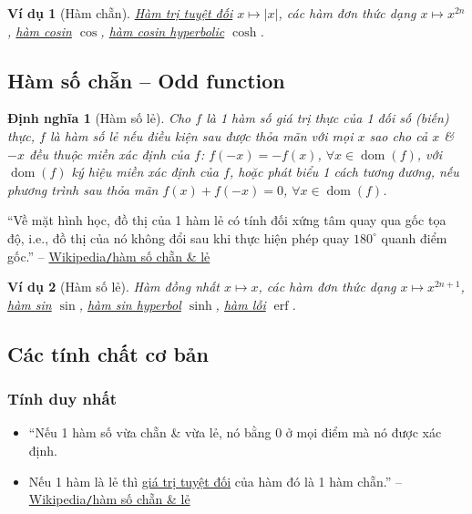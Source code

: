 \documentclass[oneside]{book}
\numberwithin{equation}{section}
\newtheorem{dinhnghia}{Định nghĩa}[section]
\newtheorem{vidu}{Ví dụ}[section]
\begin{document}
\begin{vidu}[Hàm chẵn]
	\href{https://vi.wikipedia.org/wiki/Gi%C3%A1_tr%E1%BB%8B_tuy%E1%BB%87t_%C4%91%E1%BB%91i}{Hàm trị tuyệt đối} $x\mapsto|x|$, các hàm đơn thức dạng $x\mapsto x^{2n}$, \href{https://vi.wikipedia.org/wiki/H%C3%A0m_l%C6%B0%E1%BB%A3ng_gi%C3%A1c}{hàm cosin} $\cos$, \href{https://vi.wikipedia.org/wiki/H%C3%A0m_hyperbolic}{hàm cosin hyperbolic} $\cosh$.
\end{vidu}

\subsection{Hàm số chẵn -- Odd function}

\begin{dinhnghia}[Hàm số lẻ]
	Cho $f$ là 1 hàm số giá trị thực của 1 đối số (biến) thực, $f$ là hàm số \emph{lẻ} nếu điều kiện sau được thỏa mãn với mọi $x$ sao cho cả $x$ \& $-x$ đều thuộc miền xác định của $f$: $f(-x) = -f(x)$, $\forall x\in\operatorname{dom}(f)$, với $\operatorname{dom}(f)$ ký hiệu miền xác định của $f$, hoặc phát biểu 1 cách tương đương, nếu phương trình sau thỏa mãn $f(x) + f(-x) = 0$, $\forall x\in\operatorname{dom}(f)$.
\end{dinhnghia}
``Về mặt hình học, đồ thị của 1 hàm lẻ có tính đối xứng tâm quay qua gốc tọa độ, i.e., đồ thị của nó không đổi sau khi thực hiện phép quay $180^\circ$ quanh điểm gốc.'' -- \href{https://vi.wikipedia.org/wiki/H%C3%A0m_s%E1%BB%91_ch%E1%BA%B5n_v%C3%A0_l%E1%BA%BB}{Wikipedia\texttt{/}hàm số chẵn \& lẻ}

\begin{vidu}[Hàm số lẻ]
	Hàm đồng nhất $x\mapsto x$, các hàm đơn thức dạng $x\mapsto x^{2n + 1}$, \href{https://vi.wikipedia.org/wiki/Sin}{hàm sin} $\sin$, \href{https://vi.wikipedia.org/wiki/H%C3%A0m_hyperbolic}{hàm sin hyperbol} $\sinh$, \href{https://vi.wikipedia.org/wiki/H%C3%A0m_l%E1%BB%97i}{hàm lỗi} $\operatorname{erf}$.
\end{vidu}

\subsection{Các tính chất cơ bản}

\subsubsection{Tính duy nhất}
\begin{itemize}
	\item ``Nếu 1 hàm số vừa chẵn \& vừa lẻ, nó bằng $0$ ở mọi điểm mà nó được xác định.
	\item Nếu 1 hàm là lẻ thì \href{https://vi.wikipedia.org/wiki/Gi%C3%A1_tr%E1%BB%8B_tuy%E1%BB%87t_%C4%91%E1%BB%91i}{giá trị tuyệt đối} của hàm đó là 1 hàm chẵn.'' -- \href{https://vi.wikipedia.org/wiki/H%C3%A0m_s%E1%BB%91_ch%E1%BA%B5n_v%C3%A0_l%E1%BA%BB}{Wikipedia\texttt{/}hàm số chẵn \& lẻ}
\end{itemize}
\end{document}
